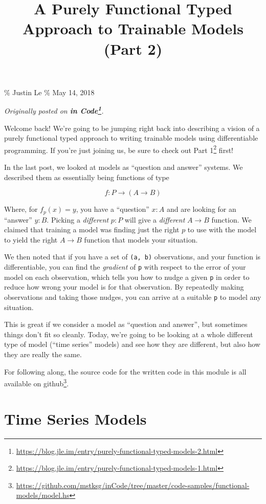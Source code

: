 \documentclass[]{article}
\title{A Purely Functional Typed Approach to Trainable Models (Part 2)}
\renewcommand{\href}[2]{#2\footnote{\url{#1}}}
\begin{document}
\maketitle

\% Justin Le \% May 14, 2018

\emph{Originally posted on
\textbf{\href{https://blog.jle.im/entry/purely-functional-typed-models-2.html}{in
Code}}.}

Welcome back! We're going to be jumping right back into describing a vision of a
purely functional typed approach to writing trainable models using
differentiable programming. If you're just joining us, be sure to check out
\href{https://blog.jle.im/entry/purely-functional-typed-models-1.html}{Part 1}
first!

In the last post, we looked at models as ``question and answer'' systems. We
described them as essentially being functions of type

\[
f : P \rightarrow (A \rightarrow B)
\]

Where, for \(f_p(x) = y\), you have a ``question'' \(x : A\) and are looking for
an ``answer'' \(y : B\). Picking a \emph{different} \(p : P\) will give a
\emph{different} \(A
\rightarrow B\) function. We claimed that training a model was finding just the
right \(p\) to use with the model to yield the right \(A \rightarrow B\)
function that models your situation.

We then noted that if you have a set of \texttt{(a,\ b)} observations, and your
function is differentiable, you can find the \emph{gradient} of \texttt{p} with
respect to the error of your model on each observation, which tells you how to
nudge a given \texttt{p} in order to reduce how wrong your model is for that
observation. By repeatedly making observations and taking those nudges, you can
arrive at a suitable \texttt{p} to model any situation.

This is great if we consider a model as ``question and answer'', but sometimes
things don't fit so cleanly. Today, we're going to be looking at a whole
different type of model (``time series'' models) and see how they are different,
but also how they are really the same.

For following along, the source code for the written code in this module is all
available
\href{https://github.com/mstksg/inCode/tree/master/code-samples/functional-models/model.hs}{on
github}.

\section{Time Series Models}\label{time-series-models}
\end{document}
